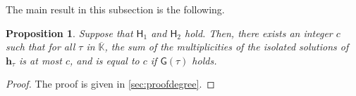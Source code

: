 \documentclass[11pt]{article}
\numberwithin{Property}{section}
\numberwithin{Theorem}{section}
\newtheorem{Proposition}{Proposition}%
\numberwithin{Proposition}{section}
\numberwithin{Lemma}{section}
\numberwithin{Corollary}{section}
\numberwithin{Definition}{section}
\numberwithin{Remark}{section}
\numberwithin{Conjecture}{section}
\numberwithin{Problem}{section}
\numberwithin{Claim}{section}
\theoremstyle{definition}
\numberwithin{Example}{section}
\renewcommand{\le}{\leqslant}
\def\bar{\overline}
\renewcommand{\le}{\leqslant} %
\newcommand{\field}{\mathbb{K}} %
\newcommand{\mat}[1]{\mathbf{\MakeUppercase{#1}}} %
\newcommand{\improve}[1]{\textcolor{blue}{#1}} %
\begin{document}
The main result in this subsection is the following.
\begin{Proposition}\label{degree_fiber}
Suppose that $\mathsf{H}_1$ and $\mathsf{H}_2$ hold. Then, there exists an integer $c$ such that for all $\tau$ in $\bar{\field}$, the sum of the multiplicities of the isolated solutions of $\mathbf{h}_\tau$ is at most $c$, and is equal to $c$ if $\mathsf{G}(\tau)$ holds.
\end{Proposition}
\begin{proof}
The proof is given in \improve{\cref{sec:proofdegree}}. 
\end{proof}
\end{document}
